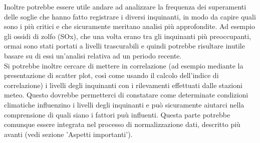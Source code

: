 \documentclass{article}
\begin{document}
Inoltre potrebbe essere utile andare ad analizzare la frequenza dei superamenti delle soglie che hanno fatto registrare i diversi inquinanti, in modo da capire quali sono i più critici e che sicuramente meritano analisi più approfondite. Ad esempio gli ossidi di zolfo (SOx), che una volta erano tra gli inquinanti più preoccupanti, ormai sono stati portati a livelli trascurabili e quindi potrebbe risultare inutile basare su di essi un'analisi relativa ad un periodo recente.
\\Si potrebbe inoltre cercare di mettere in correlazione (ad esempio mediante la presentazione di scatter plot, così come usando il calcolo dell'indice di correlazione) i livelli degli inquinanti con i rilevamenti effettuati dalle stazioni meteo. Questo dovrebbe permetterci di constatare come determinate condizioni climatiche influenzino i livelli degli inquinanti e può sicuramente aiutarci nella comprensione di quali siano i fattori puù influenti. Questa parte potrebbe comunque essere integrata nel processo di normalizzazione dati, descritto più avanti (vedi sezione 'Aspetti importanti').
\newpage
\end{document}

